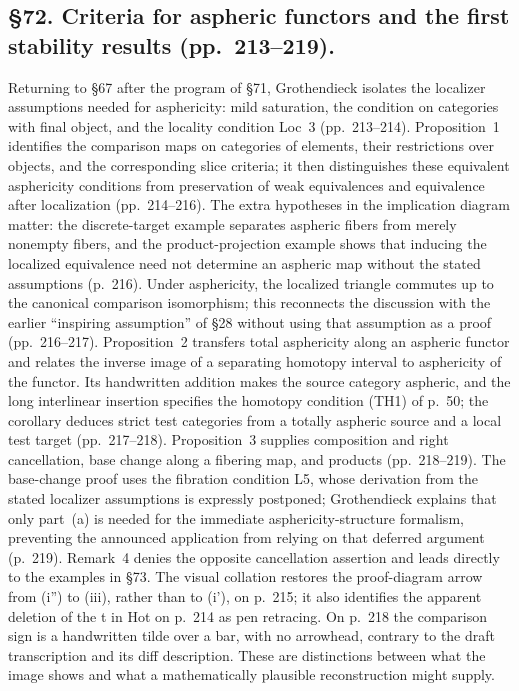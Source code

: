 \documentclass[10pt,oneside]{book}
\begin{document}
\subsection*{\S72. Criteria for aspheric functors and the first stability results (pp.\ 213--219).}
Returning to \S67 after the program of \S71, Grothendieck isolates the localizer assumptions needed for asphericity: mild saturation, the condition on categories with final object, and the locality condition Loc~3 (pp.\ 213--214). Proposition~1 identifies the comparison maps on categories of elements, their restrictions over objects, and the corresponding slice criteria; it then distinguishes these equivalent asphericity conditions from preservation of weak equivalences and equivalence after localization (pp.\ 214--216). The extra hypotheses in the implication diagram matter: the discrete-target example separates aspheric fibers from merely nonempty fibers, and the product-projection example shows that inducing the localized equivalence need not determine an aspheric map without the stated assumptions (p.\ 216). Under asphericity, the localized triangle commutes up to the canonical comparison isomorphism; this reconnects the discussion with the earlier ``inspiring assumption'' of \S28 without using that assumption as a proof (pp.\ 216--217). Proposition~2 transfers total asphericity along an aspheric functor and relates the inverse image of a separating homotopy interval to asphericity of the functor. Its handwritten addition makes the source category aspheric, and the long interlinear insertion specifies the homotopy condition (TH1) of p.\ 50; the corollary deduces strict test categories from a totally aspheric source and a local test target (pp.\ 217--218). Proposition~3 supplies composition and right cancellation, base change along a fibering map, and products (pp.\ 218--219). The base-change proof uses the fibration condition L5, whose derivation from the stated localizer assumptions is expressly postponed; Grothendieck explains that only part~(a) is needed for the immediate asphericity-structure formalism, preventing the announced application from relying on that deferred argument (p.\ 219). Remark~4 denies the opposite cancellation assertion and leads directly to the examples in \S73. The visual collation restores the proof-diagram arrow from (i'') to (iii), rather than to (i'), on p.\ 215; it also identifies the apparent deletion of the t in Hot on p.\ 214 as pen retracing. On p.\ 218 the comparison sign is a handwritten tilde over a bar, with no arrowhead, contrary to the draft transcription and its diff description. These are distinctions between what the image shows and what a mathematically plausible reconstruction might supply.
\end{document}
